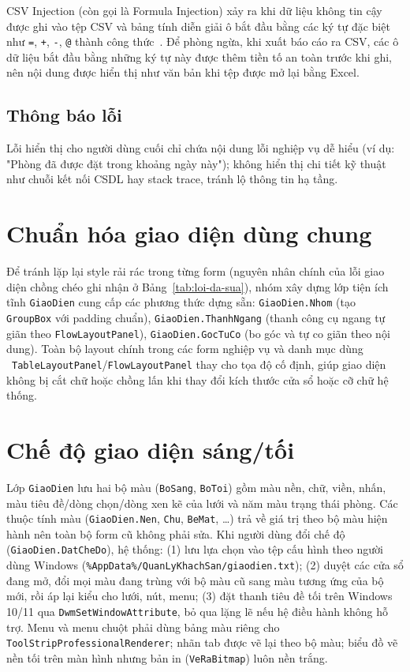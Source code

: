 \documentclass[14pt]{report}
\begin{document}
CSV Injection (còn gọi là Formula Injection) xảy ra khi dữ liệu không tin cậy được ghi vào tệp CSV và bảng tính diễn giải ô bắt đầu bằng các ký tự đặc biệt như \texttt{=}, \texttt{+}, \texttt{-}, \texttt{@} thành công thức~\cite{owasp-csv}. Để phòng ngừa, khi xuất báo cáo ra CSV, các ô dữ liệu bắt đầu bằng những ký tự này được thêm tiền tố an toàn trước khi ghi, nên nội dung được hiển thị như văn bản khi tệp được mở lại bằng Excel.

\subsection{Thông báo lỗi}

Lỗi hiển thị cho người dùng cuối chỉ chứa nội dung lỗi nghiệp vụ dễ hiểu (ví dụ: "Phòng đã được đặt trong khoảng ngày này"); không hiển thị chi tiết kỹ thuật như chuỗi kết nối CSDL hay stack trace, tránh lộ thông tin hạ tầng.

\section{Chuẩn hóa giao diện dùng chung}

Để tránh lặp lại style rải rác trong từng form (nguyên nhân chính của lỗi giao diện chồng chéo ghi nhận ở Bảng~\ref{tab:loi-da-sua}), nhóm xây dựng lớp tiện ích tĩnh \texttt{GiaoDien} cung cấp các phương thức dựng sẵn: \texttt{GiaoDien.Nhom} (tạo \texttt{GroupBox} với padding chuẩn), \texttt{GiaoDien.ThanhNgang} (thanh công cụ ngang tự giãn theo \texttt{FlowLayoutPanel}), \texttt{GiaoDien.GocTuCo} (bo góc và tự co giãn theo nội dung). Toàn bộ layout chính trong các form nghiệp vụ và danh mục dùng \\~\texttt{TableLayoutPanel}/\texttt{FlowLayoutPanel} thay cho tọa độ cố định, giúp giao diện không bị cắt chữ hoặc chồng lấn khi thay đổi kích thước cửa sổ hoặc cỡ chữ hệ thống.

\section{Chế độ giao diện sáng/tối}

Lớp \texttt{GiaoDien} lưu hai bộ màu (\texttt{BoSang}, \texttt{BoToi}) gồm màu nền, chữ, viền, nhấn, màu tiêu đề/dòng chọn/dòng xen kẽ của lưới và năm màu trạng thái phòng. Các thuộc tính màu (\texttt{GiaoDien.Nen}, \texttt{Chu}, \texttt{BeMat}, \ldots) trả về giá trị theo bộ màu hiện hành nên toàn bộ form cũ không phải sửa. Khi người dùng đổi chế độ (\texttt{GiaoDien.DatCheDo}), hệ thống: (1) lưu lựa chọn vào tệp cấu hình theo người dùng Windows (\texttt{\%AppData\%/QuanLyKhachSan/giaodien.txt}); (2) duyệt các cửa sổ đang mở, đổi mọi màu đang trùng với bộ màu cũ sang màu tương ứng của bộ mới, rồi áp lại kiểu cho lưới, nút, menu; (3) đặt thanh tiêu đề tối trên Windows 10/11 qua \texttt{DwmSetWindowAttribute}, bỏ qua lặng lẽ nếu hệ điều hành không hỗ trợ. Menu và menu chuột phải dùng bảng màu riêng cho \texttt{ToolStripProfessionalRenderer}; nhãn tab được vẽ lại theo bộ màu; biểu đồ vẽ nền tối trên màn hình nhưng bản in (\texttt{VeRaBitmap}) luôn nền trắng.
\end{document}
